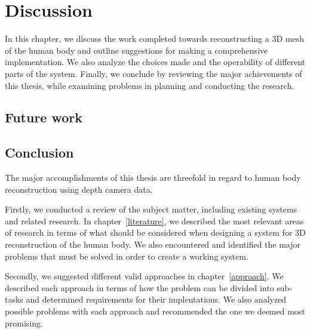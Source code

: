 \chapter{Discussion}

In this chapter, we discuss the work completed towards reconstructing a 3D mesh of the human body and outline suggestions for making a comprehensive implementation. We also analyze the choices made and the operability of different parts of the system. Finally, we conclude by reviewing the major achievements of this thesis, while examining problems in planning and conducting the research.



\section{Future work}

\section{Conclusion}

The major accomplishments of this thesis are threefold in regard to human body reconstruction using depth camera data.

Firstly, we conducted a review of the subject matter, including existing systems and related research. In chapter~\ref{literature}, we described the most relevant areas of research in terms of what should be considered when designing a system for 3D reconstruction of the human body. We also encountered and identified the major problems that must be solved in order to create a working system.

Secondly, we suggested different valid approaches in chapter~\ref{approach}. We described each approach in terms of how the problem can be divided into sub-tasks and determined requirements for their implentations. We also analyzed possible problems with each approach and recommended the one we deemed most promising.

